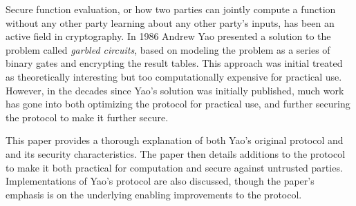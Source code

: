 Secure function evaluation, or how two parties can jointly compute a function without any other party learning about any other party's inputs, has been an active field in cryptography. In 1986 Andrew Yao presented a solution to the problem called \emph{garbled circuits}, based on modeling the problem as a series of binary gates and encrypting the result tables. This approach was initial treated as theoretically interesting but too computationally expensive for practical use.  However, in the decades since Yao's solution was initially published, much work has gone into both optimizing the protocol for practical use, and further securing the protocol to make it further secure.

This paper provides a thorough explanation of both Yao's original protocol and and its security characteristics.  The paper then details additions to the protocol to make it both practical for computation and secure against untrusted parties.  Implementations of Yao's protocol are also discussed, though the paper's emphasis is on the underlying enabling improvements to the protocol.
